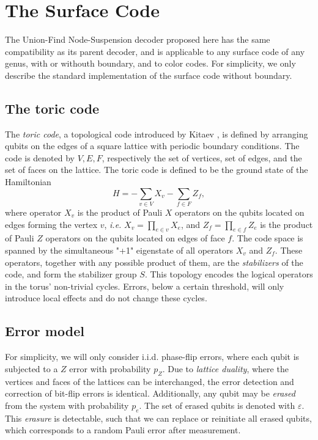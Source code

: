 \section{The Surface Code}\label{sec:surfacecode}

The Union-Find Node-Suspension decoder proposed here has the same compatibility as its parent decoder, and is applicable to any surface code of any genus, with or withouth boundary, and to color codes. For simplicity, we only describe the standard implementation of the surface code without boundary.

\subsection{The toric code}

The \emph{toric code}, a topological code introduced by Kitaev \cite{kitaev2003fault}, is defined by arranging qubits on the edges of a square lattice with periodic boundary conditions. The code is denoted by $V,E,F$, respectively the set of vertices, set of edges, and the set of faces on the lattice. The toric code is defined to be the ground state of the Hamiltonian 
\begin{equation}
    H = -\sum_{v \in V} X_v -\sum_{f \in F} Z_f, 
\end{equation}
where operator $X_v$ is the product of Pauli $X$ operators on the qubits located on edges forming the vertex $v$, \emph{i.e.} $X_v = \prod_{e \in v} X_e$, and $Z_f = \prod_{e \in f} Z_e$ is the product of Pauli $Z$ operators on the qubits located on edges of face $f$. The code space is spanned by the simultaneous "+1" eigenstate of all operators $X_v$ and $Z_f$. These operators, together with any possible product of them, are the \emph{stabilizers} of the code, and form the stabilizer group $S$. This topology encodes the logical operators in the torus' non-trivial cycles. Errors, below a certain threshold, will only introduce local effects and do not change these cycles.

\subsection{Error model}
For simplicity, we will only consider i.i.d. phase-flip errors, where each qubit is subjected to a $Z$ error with probability $p_Z$. Due to \emph{lattice duality}, where the vertices and faces of the lattices can be interchanged, the error detection and correction of bit-flip errors is identical. 
Additionally, any qubit may be \emph{erased} from the system with probability $p_e$. The set of erased qubits is denoted with $\varepsilon$. This \emph{erasure} is detectable, such that we can replace or reinitiate all erased qubits, which corresponds to a random Pauli error after measurement. 

